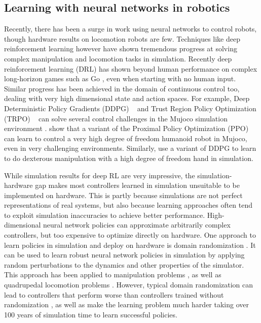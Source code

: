 
\subsection{Learning with neural networks in robotics}

Recently, there has been a surge in work using neural networks to control robots, though hardware results on locomotion robots are few. Techniques like deep reinforcement learning however have shown tremendous progress at solving complex manipulation and locomotion tasks in simulation. Recently deep reinforcement learning (DRL) has shown beyond human performance on complex long-horizon games such as Go \cite{silver2016mastering}, even when starting with no human input. Similar progress has been achieved in the domain of continuous control too, dealing with very high dimensional state and action spaces. For example, Deep Deterministic Policy Gradients (DDPG) ~\citep{lillicrap2015continuous} and Trust Region Policy Optimization  (TRPO) ~\citep{schulman2015trust} can solve several control challenges in the Mujoco simulation environment \citep{todorov2012mujoco}. \cite{heess2017emergence} show that a variant of the Proximal Policy Optimization (PPO) \citep{schulman2017proximal} can learn to control a very high degree of freedom humanoid robot in Mujoco, even in very challenging environments. Similarly, \cite{rajeswaran2017towards} use a variant of DDPG to learn to do dexterous manipulation with a high degree of freedom hand in simulation.

While simulation results for deep RL are very impressive, the simulation-hardware gap makes most controllers learned in simulation unsuitable to be implemented on hardware. This is partly because simulations are not perfect representations of real systems, but also because learning approaches often tend to exploit simulation inaccuracies to achieve better performance. High-dimensional neural network policies can approximate arbitrarily complex controllers, but too expensive to optimize directly on hardware. One approach to learn policies in simulation and deploy on hardware is domain randomization \citep{mordatch2015ensemble}. It can be used to learn robust neural network policies in simulation by applying random perturbations to the dynamics and other properties of the simulator. This approach has been applied to manipulation problems \citep{peng2017sim}, as well as quadrupedal locomotion problems \citep{tan2018sim}. However, typical domain randomization can lead to controllers that perform worse than controllers trained without randomization \citep{tan2018sim}, as well as make the learning problem much harder \citep{2018arXiv180800177O} taking over 100 years of simulation time to learn successful policies.   

